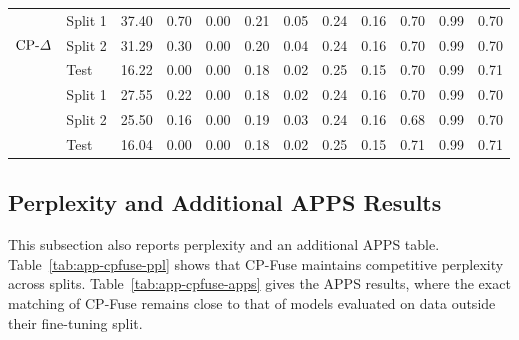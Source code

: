\begin{table}[!tbp]
{\begin{tabular}{ll|cccccccccc}
& Split 1 & 37.40 & 0.70 & 0.00 & 0.21 & 0.05 & 0.24 & 0.16 & 0.70 & 0.99 & 0.70 \\
& Split 2 & 31.29 & 0.30 & 0.00 & 0.20 & 0.04 & 0.24 & 0.16 & 0.70 & 0.99 & 0.70 \\
& Test    & 16.22 & 0.00 & 0.00 & 0.18 & 0.02 & 0.25 & 0.15 & 0.70 & 0.99 & 0.71 \\
\midrule
{}
& Split 1 & 27.55 & 0.22 & 0.00 & 0.18 & 0.02 & 0.24 & 0.16 & 0.70 & 0.99 & 0.70 \\
& Split 2 & 25.50 & 0.16 & 0.00 & 0.19 & 0.03 & 0.24 & 0.16 & 0.68 & 0.99 & 0.70 \\
& Test    & 16.04 & 0.00 & 0.00 & 0.18 & 0.02 & 0.25 & 0.15 & 0.71 & 0.99 & 0.71 \\
\bottomrule
\end{tabular}}
\end{table}

\subsection{Perplexity and Additional APPS Results}

This subsection also reports perplexity and an additional APPS table. Table~\ref{tab:app-cpfuse-ppl} shows that CP-Fuse maintains competitive perplexity across splits. Table~\ref{tab:app-cpfuse-apps} gives the APPS results, where the exact matching of CP-Fuse remains close to that of models evaluated on data outside their fine-tuning split.

